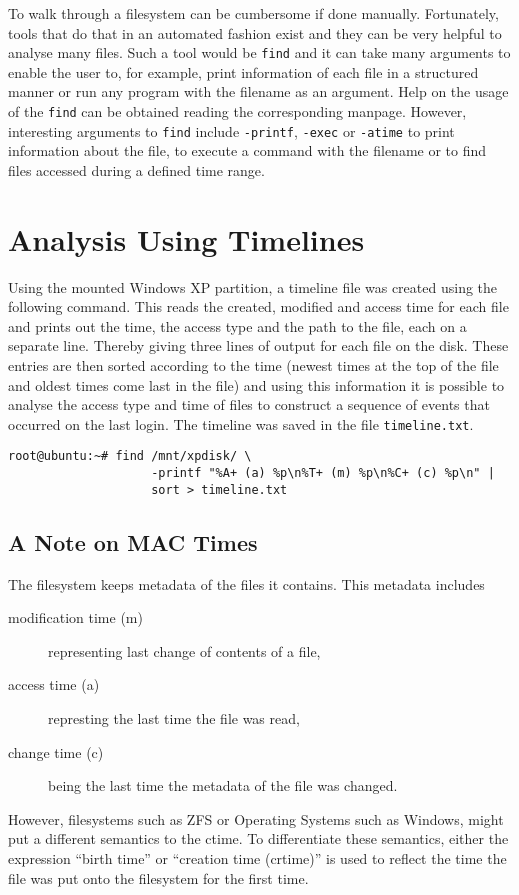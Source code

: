 \documentclass[a4paper,
    11pt,
    normalheadings,
    parindent,
    UKenglish,
    abstracton,
    ]{scrartcl}
\begin{document}
To walk through a filesystem can be cumbersome if done manually.
Fortunately, tools that do that in an automated fashion exist and they can be very helpful to analyse many files.
Such a tool would be \texttt{find} and it can take many arguments to enable the user to, for example, print information of each file in a structured manner or run any program with the filename as an argument.
Help on the usage of the \texttt{find} can be obtained reading the corresponding manpage.
However, interesting arguments to \texttt{find} include \texttt{-printf}, \texttt{-exec} or \texttt{-atime} to print information about the file, to execute a command with the filename or to find files accessed during a defined time range.


\section{Analysis Using Timelines}

Using the mounted Windows XP partition, a timeline file was created using the following command.
This reads the created, modified and access time for each file and prints out the time, the access type and the path to the file, each on a separate line.
Thereby giving three lines of output for each file on the disk.
These entries are then sorted according to the time (newest times at the top of the file and oldest times come last in the file) and using this information it is possible to analyse the access type and time of files to construct a sequence of events that occurred on the last login.
The timeline was saved in the file {\tt timeline.txt}.

\begin{verbatim}
root@ubuntu:~# find /mnt/xpdisk/ \
                    -printf "%A+ (a) %p\n%T+ (m) %p\n%C+ (c) %p\n" |
                    sort > timeline.txt
\end{verbatim}

\subsection{A Note on MAC Times}

The filesystem keeps metadata of the files it contains.
This metadata includes
\begin{description}
    \item[modification time (m)] representing last change of contents of a file,
    \item[access time (a)] represting the last time the file was read,
    \item[change time (c)] being the last time the metadata of the file was changed.
\end{description}
However, filesystems such as ZFS or Operating Systems such as Windows, might put a different semantics to the ctime.
To differentiate these semantics, either the expression ``birth time'' or ``creation time (crtime)'' is used to reflect the time the file was put onto the filesystem for the first time.
\end{document}
